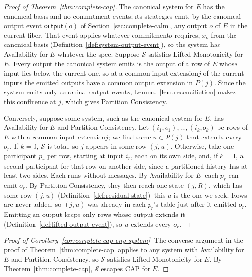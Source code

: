 \documentclass[sigconf]{cidr-2027}
\theoremstyle{remark}
\newcommand{\commitment}{commitment\xspace}
\newcommand{\indesc}{input extension\xspace} %
\newcommand{\outrel}{extends\xspace}          %
\newcommand{\outnoun}{output extension\xspace}%
\newcommand{\Spec}{\mathcal{S}}
\newcommand{\fiber}[1]{P(#1)}
\begin{document}
\color{blue!70!black}\begin{proof}[Proof of Theorem~\ref{thm:complete-cap}]
The canonical system for $E$ has the canonical basis and no \commitment
events; its strategies emit, by the canonical output event $\mathsf{output}(o)$
of Section~\ref{sec:complete-calm}, any output $o$ of $E$ in the current fiber.
That event applies whatever \commitment $o$ requires, $x_o$ from the
canonical basis (Definition~\ref{def:system-output-event}), so the system has
Availability for $E$ whatever the spec.  Suppose $\Spec$ satisfies Lifted
Monotonicity for $E$.  Every output the canonical system emits is the output of a row of $E$ whose
input lies below the current one, so at a common \indesc $j$ of the current
inputs the emitted outputs have a common \outnoun in $\fiber{j}$.  Since the
system emits only canonical output events, Lemma~\ref{lem:reconciliation}
makes this confluence at $j$, which gives Partition Consistency.\color{black}

\color{blue!70!black}Conversely, suppose some system, such as the canonical system for $E$, has
Availability for $E$ and Partition Consistency.  Let $(i_1,o_1),\ldots,(i_k,o_k)$ be rows of $E$ with a common
\indesc $j$; we find some $u\in\fiber{j}$ that \outrel every $o_r$.  If $k=0$,
$\Spec$ is total, so $j$ appears in some row $(j,u)$.  Otherwise, take one
participant $p_r$ per row, starting at input $i_r$, each on its own side,
and, if $k=1$, a second participant for that row on another side, since a
partitioned history has at least two sides.  Each runs without messages.
By Availability for $E$, each $p_r$ can emit $o_r$.  By Partition Consistency,
they then reach one state $(j,R)$, which has some row $(j,u)$
(Definition~\ref{def:residual-state}); this $u$ is the one we seek.  Rows are
never added, so $(j,u)$ was already in each $p_r$'s table just after it
emitted $o_r$.  Emitting an output keeps only rows whose output \outrel it
(Definition~\ref{def:lifted-output-event}), so $u$ \outrel every
$o_r$.\color{black}
\end{proof}

\begin{proof}[Proof of Corollary~\ref{cor:complete-cap-any-system}]
The converse argument in the proof of Theorem~\ref{thm:complete-cap} applies
to any system with Availability for $E$ and Partition Consistency, so $\Spec$
satisfies Lifted Monotonicity for $E$.  By Theorem~\ref{thm:complete-cap},
$\Spec$ escapes CAP for $E$.
\end{proof}
\end{document}
